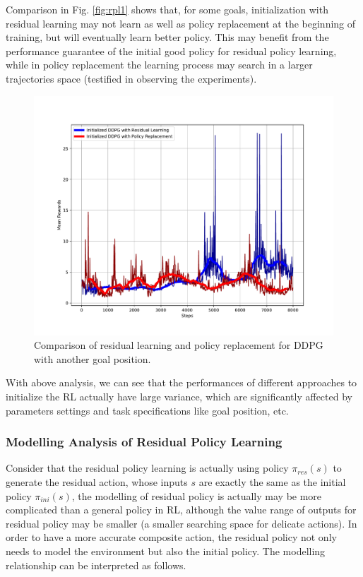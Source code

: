 \documentclass{article}
\begin{document}
Comparison in Fig. \ref{fig:rpl1} shows that, for some goals, initialization with residual learning may not learn as well as policy replacement at the beginning of training, but will eventually learn better policy. This may benefit from the performance guarantee of the initial good policy for residual policy learning, while in policy replacement the learning process may search in a larger trajectories space (testified in observing the experiments). 
\begin{figure}[htbp]
	\centering
	\includegraphics[scale=0.5]{img/res_ddpg2.pdf}
	\caption{Comparison of residual learning and policy replacement for DDPG with another goal position.}
	\label{fig:rpl3}
\end{figure}

With above analysis, we can see that the performances of different approaches to initialize the RL actually have large variance, which are significantly affected by parameters settings and task specifications like goal position, etc. 

\subsubsection{Modelling Analysis of Residual Policy Learning}
Consider that the residual policy learning is actually using policy $\pi_{res}(s)$ to generate the residual action, whose inputs $s$ are exactly the same as the initial policy $\pi_{ini}(s)$, the modelling of residual policy is actually may be more complicated than a general policy in RL, although the value range of outputs for residual policy may be smaller (a smaller searching space for delicate actions). In order to have a more accurate composite action, the residual policy not only needs to model the environment but also the initial policy. The modelling relationship can be interpreted as follows. 
\end{document}
